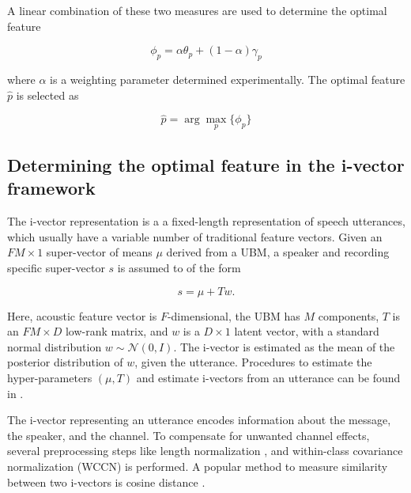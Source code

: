 \documentclass{article}
\begin{document}


A linear combination of these two measures are used to determine the optimal
feature

\begin{equation}
\phi_p = \alpha \theta_p  + (1-\alpha) \gamma_p
\label{eq:phiFunc}
\end{equation}

where $\alpha$ is a weighting parameter determined experimentally. The optimal
feature $\hat{p}$ is selected as 

\begin{equation}
\hat{p} = \arg\max_p \{\phi_p\}
\label{eq:ubm_optFeat}
\end{equation}

\subsection{Determining the optimal feature in the i-vector framework}
\label{subsec:ivec_optFeat}

The i-vector representation \cite{dehak_ivector} is a a fixed-length
representation of speech utterances, which usually have a variable number of
traditional feature vectors.  Given an $FM \times 1$ super-vector of means $\mu$
derived from a UBM, a speaker and recording specific super-vector $s$ is assumed to of
the form

\begin{equation}
s = \mu + T w.
\end{equation}

Here, acoustic feature vector is $F$-dimensional, the UBM has $M$ components,
$T$ is an $FM \times D$ low-rank matrix, and $w$ is a $D \times 1$ latent
vector, with a standard normal distribution $w \sim \mathcal{N}(0,I)$. The
i-vector is estimated as the mean of the posterior distribution of $w$, given
the utterance. Procedures to estimate the hyper-parameters $(\mu, T)$ and 
estimate i-vectors from an utterance can be found in \cite{dehak_ivector}.

The i-vector representing an utterance encodes information about the message,
the speaker, and the channel. To compensate for unwanted channel effects,
several preprocessing steps like length normalization \cite{garcia_lengthNorm},
and within-class covariance normalization (WCCN) \cite{wccn} is performed. A
popular method to measure similarity between two i-vectors is cosine 
distance \cite{dehak_ivector}.
\end{document}
